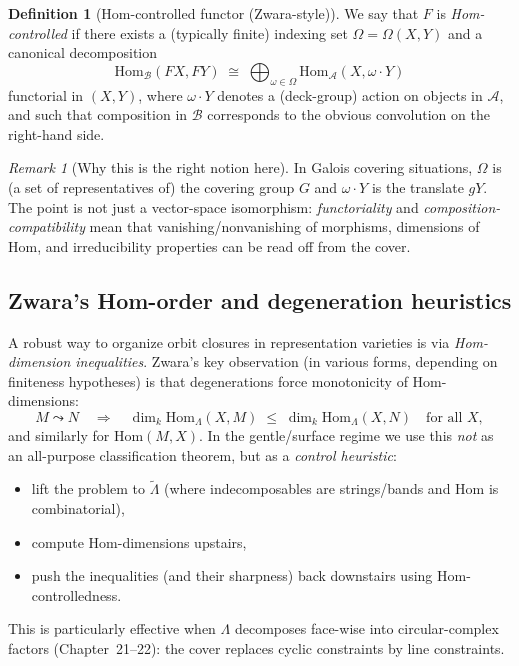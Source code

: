 \documentclass[11pt,oneside]{amsbook}
\numberwithin{equation}{section}
\theoremstyle{plain}
\theoremstyle{definition}
\newtheorem{definition}[theorem]{Definition}
\theoremstyle{remark}
\newtheorem{remark}[theorem]{Remark}
\begin{document}
\begin{definition}[Hom-controlled functor (Zwara-style)]
We say that $F$ is \emph{Hom-controlled} if there exists a (typically finite) indexing set $\Omega=\Omega(X,Y)$
and a canonical decomposition
\[
\mathrm{Hom}_{\mathcal{B}}(F X, F Y)\;\cong\;\bigoplus_{\omega\in\Omega}\mathrm{Hom}_{\mathcal{A}}(X, \omega\cdot Y)
\]
functorial in $(X,Y)$, where $\omega\cdot Y$ denotes a (deck-group) action on objects in $\mathcal{A}$,
and such that composition in $\mathcal{B}$ corresponds to the obvious convolution on the right-hand side.
\end{definition}

\begin{remark}[Why this is the right notion here]
In Galois covering situations, $\Omega$ is (a set of representatives of) the covering group $G$ and
$\omega\cdot Y$ is the translate $gY$. The point is not just a vector-space isomorphism: \emph{functoriality}
and \emph{composition-compatibility} mean that vanishing/nonvanishing of morphisms, dimensions of Hom,
and irreducibility properties can be read off from the cover.
\end{remark}

\subsection{Zwara's Hom-order and degeneration heuristics}
A robust way to organize orbit closures in representation varieties is via \emph{Hom-dimension inequalities}.
Zwara's key observation (in various forms, depending on finiteness hypotheses) is that degenerations force
monotonicity of Hom-dimensions:
\[
M \leadsto N \quad\Longrightarrow\quad \dim_k\mathrm{Hom}_\Lambda(X,M)\;\le\;\dim_k\mathrm{Hom}_\Lambda(X,N)
\quad\text{for all }X,
\]
and similarly for $\mathrm{Hom}(M,X)$. In the gentle/surface regime we use this \emph{not} as an all-purpose
classification theorem, but as a \emph{control heuristic}:
\begin{itemize}
\item lift the problem to $\widetilde{\Lambda}$ (where indecomposables are strings/bands and Hom is combinatorial),
\item compute Hom-dimensions upstairs,
\item push the inequalities (and their sharpness) back downstairs using Hom-controlledness.
\end{itemize}
This is particularly effective when $\Lambda$ decomposes face-wise into circular-complex factors
(Chapter~21--22): the cover replaces cyclic constraints by line constraints.
\end{document}
